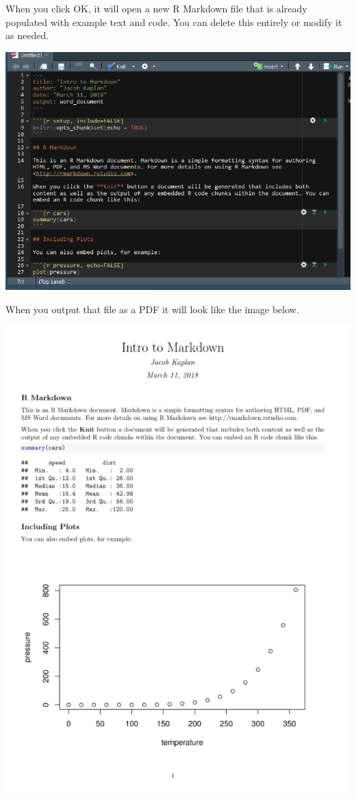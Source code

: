 \documentclass[
]{krantz}
\begin{document}
When you click OK, it will open a new R Markdown file that is already populated with example text and code. You can delete this entirely or modify it as needed.

\includegraphics{images/markdown6.png}

When you output that file as a PDF it will look like the image below.

\includegraphics{images/markdown_output_example.PNG}
\end{document}
